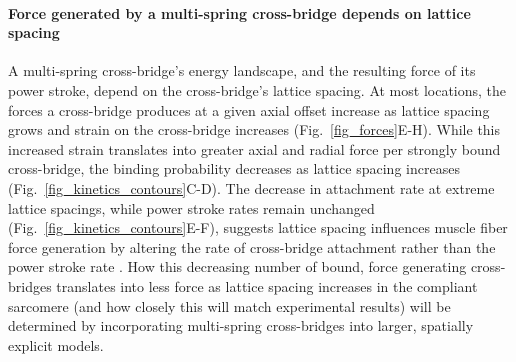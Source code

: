 \documentclass[]{article}
\begin{document}
\paragraph{Force generated by a multi-spring cross-bridge depends on lattice spacing} %
A multi-spring cross-bridge's energy landscape, and the resulting force of its power stroke, depend on the cross-bridge's lattice spacing.
At most locations, the forces a cross-bridge produces at a given axial offset increase as lattice spacing grows and strain on the cross-bridge increases (Fig.~\ref{fig_forces}E-H). 
While this increased strain translates into greater axial and radial force per strongly bound cross-bridge, the binding probability decreases as lattice spacing increases (Fig.~\ref{fig_kinetics_contours}C-D).
The decrease in attachment rate at extreme lattice spacings, while power stroke rates remain unchanged (Fig.~\ref{fig_kinetics_contours}E-F), suggests lattice spacing influences muscle fiber force generation by altering the rate of cross-bridge attachment rather than the power stroke rate \citep{Martyn2004}. 
How this decreasing number of bound, force generating cross-bridges translates into less force as lattice spacing increases in the compliant sarcomere (and how closely this will match experimental results) will be determined by incorporating multi-spring cross-bridges into larger, spatially explicit models. 
\end{document}
